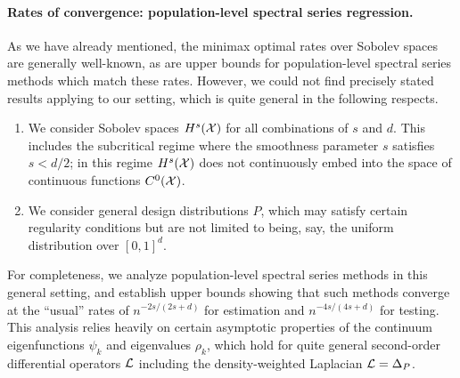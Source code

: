 \paragraph{Rates of convergence: population-level spectral series regression.}
As we have already mentioned, the minimax optimal rates over Sobolev spaces are generally well-known, as are upper bounds for population-level spectral series methods which match these rates. However, we could not find precisely stated results applying to our setting, which is quite general in the following respects.
\begin{enumerate}
	\item We consider Sobolev spaces $H^s(\mathcal{X})$ for all combinations of $s$ and $d$. This includes the subcritical regime where the smoothness parameter $s$ satisfies $s < d/2$; in this regime $H^s(\mathcal{X})$ does not continuously embed into the space of continuous functions $C^0(\mathcal{X})$.
	\item We consider general design distributions $P$, which may satisfy certain regularity conditions but are not limited to being, say, the uniform distribution over $[0,1]^d$. 
\end{enumerate}
For completeness, we analyze population-level spectral series methods in this general setting, and establish upper bounds showing that such methods converge at the ``usual'' rates of $n^{-2s/(2s + d)}$ for estimation and $n^{-4s/(4s + d)}$ for testing. This analysis relies heavily on certain asymptotic properties of the continuum eigenfunctions $\psi_k$ and eigenvalues $\rho_k$, which hold for quite general second-order differential operators $\mathcal{L}$ including the density-weighted Laplacian $\mathcal{L} = \Delta_P$.


